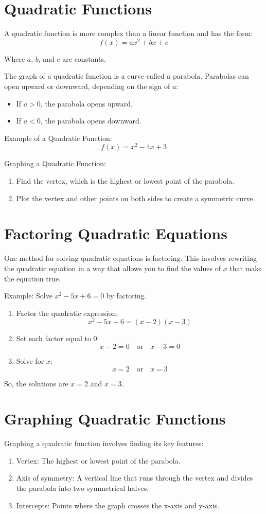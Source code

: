 \section{Quadratic Functions}
A quadratic function is more complex than a linear function and has the form:
\[ f(x) = ax^2 + bx + c \]

Where \( a \), \( b \), and \( c \) are constants.

The graph of a quadratic function is a curve called a parabola. Parabolas can open upward or downward, depending on the sign of \( a \):
\begin{itemize}
    \item If \( a > 0 \), the parabola opens upward.
    \item If \( a < 0 \), the parabola opens downward.
\end{itemize}

Example of a Quadratic Function:
\[ f(x) = x^2 - 4x + 3 \]

Graphing a Quadratic Function:
\begin{enumerate}
    \item Find the vertex, which is the highest or lowest point of the parabola.
    \item Plot the vertex and other points on both sides to create a symmetric curve.
\end{enumerate}

\section{Factoring Quadratic Equations}
One method for solving quadratic equations is factoring. This involves rewriting the quadratic equation in a way that allows you to find the values of \( x \) that make the equation true.

Example: Solve \( x^2 - 5x + 6 = 0 \) by factoring.
\begin{enumerate}
    \item Factor the quadratic expression:
    \[ x^2 - 5x + 6 = (x - 2)(x - 3) \]
    \item Set each factor equal to 0:
    \[ x - 2 = 0 \quad \text{or} \quad x - 3 = 0 \]
    \item Solve for \( x \):
    \[ x = 2 \quad \text{or} \quad x = 3 \]
\end{enumerate}
So, the solutions are \( x = 2 \) and \( x = 3 \).

\section{Graphing Quadratic Functions}
Graphing a quadratic function involves finding its key features:
\begin{enumerate}
    \item Vertex: The highest or lowest point of the parabola.
    \item Axis of symmetry: A vertical line that runs through the vertex and divides the parabola into two symmetrical halves.
    \item Intercepts: Points where the graph crosses the x-axis and y-axis.
\end{enumerate}

